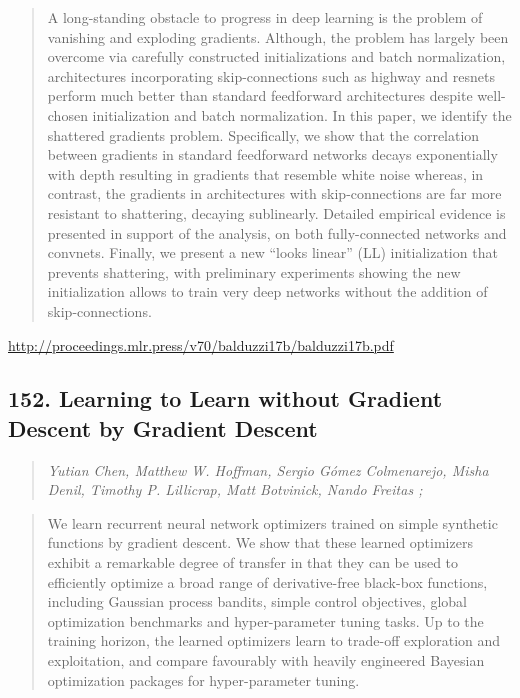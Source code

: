 \documentclass{article}
\begin{document}
\begin{quote}
    A long-standing obstacle to progress in deep learning is the problem of vanishing and exploding gradients. Although, the problem has largely been overcome via carefully constructed initializations and batch normalization, architectures incorporating skip-connections such as highway and resnets perform much better than standard feedforward architectures despite well-chosen initialization and batch normalization. In this paper, we identify the shattered gradients problem. Specifically, we show that the correlation between gradients in standard feedforward networks decays exponentially with depth resulting in gradients that resemble white noise whereas, in contrast, the gradients in architectures with skip-connections are far more resistant to shattering, decaying sublinearly. Detailed empirical evidence is presented in support of the analysis, on both fully-connected networks and convnets. Finally, we present a new “looks linear” (LL) initialization that prevents shattering, with preliminary experiments showing the new initialization allows to train very deep networks without the addition of skip-connections.  
\end{quote}

\href{http://proceedings.mlr.press/v70/balduzzi17b/balduzzi17b.pdf}{http://proceedings.mlr.press/v70/balduzzi17b/balduzzi17b.pdf}

\subsection{152. Learning to Learn without Gradient Descent by Gradient Descent}

\begin{quote}
\footnotesize{\textit{Yutian Chen, Matthew W. Hoffman, Sergio Gómez Colmenarejo, Misha Denil, Timothy P. Lillicrap, Matt Botvinick, Nando Freitas ;}}

\end{quote}

\begin{quote}
    We learn recurrent neural network optimizers trained on simple synthetic functions by gradient descent. We show that these learned optimizers exhibit a remarkable degree of transfer in that they can be used to efficiently optimize a broad range of derivative-free black-box functions, including Gaussian process bandits, simple control objectives, global optimization benchmarks and hyper-parameter tuning tasks. Up to the training horizon, the learned optimizers learn to trade-off exploration and exploitation, and compare favourably with heavily engineered Bayesian optimization packages for hyper-parameter tuning.  
\end{quote}
\end{document}

